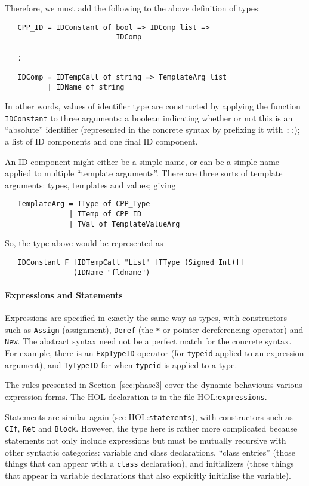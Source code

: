 \documentclass[11pt]{article}
\newcommand{\HOLfile}[1]{HOL:\texttt{#1}}
\begin{document}
Therefore, we must add the following to the above definition of \cpp{}
types:
\begin{verbatim}
   CPP_ID = IDConstant of bool => IDComp list =>
                          IDComp

   ;

   IDComp = IDTempCall of string => TemplateArg list
          | IDName of string
\end{verbatim}
In other words, values of identifier type are constructed by applying
the function \texttt{IDConstant} to three arguments: a boolean
indicating whether or not this is an ``absolute'' identifier
(represented in the concrete syntax by prefixing it with \texttt{::});
a list of ID components and one final ID component.

An ID component might either be a simple name, or can be a simple name
applied to multiple ``template arguments''.  There are three sorts of
template arguments: types, templates and values; giving
\begin{verbatim}
   TemplateArg = TType of CPP_Type
               | TTemp of CPP_ID
               | TVal of TemplateValueArg
\end{verbatim}
So, the type above would be represented as
\begin{verbatim}
   IDConstant F [IDTempCall "List" [TType (Signed Int)]]
                (IDName "fldname")
\end{verbatim}


\paragraph{Expressions and Statements}

Expressions are specified in exactly the same way as types, with
constructors such as \texttt{Assign} (assignment), \texttt{Deref} (the
\texttt{*} or pointer dereferencing operator) and \texttt{New}.  The
abstract syntax need not be a perfect match for the concrete syntax.
For example, there is an \texttt{ExpTypeID} operator (for
\texttt{typeid} applied to an expression argument), and
\texttt{TyTypeID} for when \texttt{typeid} is applied to a type.

The rules presented in Section~\ref{sec:phase3} cover the dynamic
behaviours various expression forms.  The HOL declaration is in the
file \HOLfile{expressions}.

Statements are similar again (see \HOLfile{statements}), with
constructors such as \texttt{CIf}, \texttt{Ret} and \texttt{Block}.
However, the type here is rather more complicated because statements
not only include expressions but must be mutually recursive with other
syntactic categories: variable and class declarations, ``class
entries'' (those things that can appear with a \texttt{class}
declaration), and initializers (those things that appear in variable
declarations that also explicitly initialise the variable).
\end{document}
